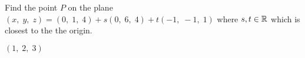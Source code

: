 
\begin{Exercise}[
name={},
title={}, 
difficulty=0,
origin={\cite{BS}}]
Find the point $P$ on the plane $(x,\; y,\; z) = (0,\; 1,\; 4) + s(0,\; 6,\; 4) + t(-1,\; -1,\; 1)$ where $s, t\in\mathbb{R}$ which is closest to the the origin.

\end{Exercise}
\begin{Answer}
$(1,\;2,\;3)$
\end{Answer}
